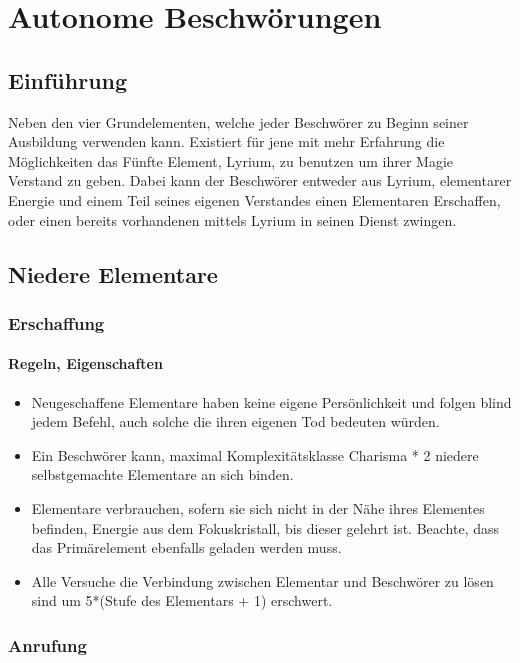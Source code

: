 \documentclass[a4paper,12pt,oneside]{book}
\begin{document}
\part{Autonome Beschwörungen}



\chapter{Einführung}
Neben den vier Grundelementen, welche jeder Beschwörer zu Beginn seiner Ausbildung verwenden kann. Existiert für jene mit mehr Erfahrung die Möglichkeiten das Fünfte Element, Lyrium, zu benutzen um ihrer Magie Verstand zu geben. Dabei kann der Beschwörer entweder aus Lyrium, elementarer Energie und einem Teil seines eigenen Verstandes einen Elementaren Erschaffen, oder einen bereits vorhandenen mittels Lyrium in seinen Dienst zwingen.

\chapter{Niedere Elementare}
\section{Erschaffung}
\subsection{Regeln, Eigenschaften}
\begin{itemize}
\item Neugeschaffene Elementare haben keine eigene Persönlichkeit und folgen blind jedem Befehl, auch solche die ihren eigenen Tod bedeuten würden.
\item Ein Beschwörer kann, maximal Komplexitätsklasse Charisma * 2 niedere selbstgemachte Elementare an sich binden.
\item Elementare verbrauchen, sofern sie sich nicht in der Nähe ihres Elementes befinden, Energie aus dem Fokuskristall, bis dieser gelehrt ist. Beachte, dass das Primärelement ebenfalls geladen werden muss.
\item Alle Versuche die Verbindung zwischen Elementar und Beschwörer zu lösen sind um 5*(Stufe des Elementars + 1) erschwert. 
\end{itemize}
\section{Anrufung}
\end{document}
